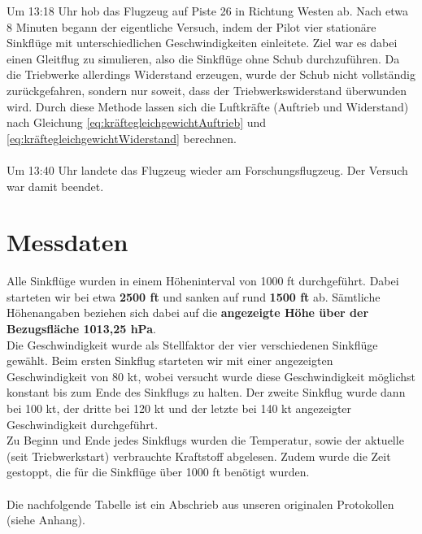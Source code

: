 \vspace{-0.3cm}
\begin{center}
\end{center}
\vspace{0.8cm}

\noindent Um 13:18 Uhr hob das Flugzeug auf Piste 26 in Richtung Westen ab. Nach etwa 8 Minuten begann der eigentliche Versuch, indem der Pilot vier stationäre Sinkflüge mit unterschiedlichen Geschwindigkeiten einleitete. Ziel war es dabei einen Gleitflug zu simulieren, also die Sinkflüge ohne Schub durchzuführen. Da die Triebwerke allerdings Widerstand erzeugen, wurde der Schub nicht vollständig zurückgefahren, sondern nur soweit, dass der Triebwerkswiderstand überwunden wird. Durch diese Methode lassen sich die Luftkräfte (Auftrieb und Widerstand) nach Gleichung \ref{eq:kräftegleichgewichtAuftrieb} und \ref{eq:kräftegleichgewichtWiderstand} berechnen.\\\\  
Um 13:40 Uhr landete das Flugzeug wieder am Forschungsflugzeug. Der Versuch war damit beendet.

\section{Messdaten}
Alle Sinkflüge wurden in einem Höheninterval von 1000 ft durchgeführt. Dabei starteten wir bei etwa \textbf{2500 ft} und sanken auf rund \textbf{1500 ft} ab. Sämtliche Höhenangaben beziehen sich dabei auf die \textbf{angezeigte Höhe über der Bezugsfläche 1013,25 hPa}.\\
Die Geschwindigkeit wurde als Stellfaktor der vier verschiedenen Sinkflüge gewählt. Beim ersten Sinkflug starteten wir mit einer angezeigten Geschwindigkeit von 80 kt, wobei versucht wurde diese Geschwindigkeit möglichst konstant bis zum Ende des Sinkflugs zu halten. Der zweite Sinkflug wurde dann bei 100 kt, der dritte bei 120 kt und der letzte bei 140 kt angezeigter Geschwindigkeit durchgeführt.\\
Zu Beginn und Ende jedes Sinkflugs wurden die Temperatur, sowie der aktuelle (seit Triebwerkstart) verbrauchte Kraftstoff abgelesen. Zudem wurde die Zeit gestoppt, die für die Sinkflüge über 1000 ft benötigt wurden.\\\\
Die nachfolgende Tabelle ist ein Abschrieb aus unseren originalen Protokollen (siehe Anhang).\\

